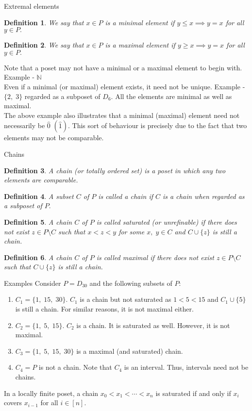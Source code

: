 \documentclass[handout, aspectratio=169]{beamer}
\newtheorem{defn}{Definition}
\begin{document}
\begin{frame}{Extremal elements}
	\begin{defn}
		We say that $x \in P$ is a minimal element if $y \le x \implies y = x$ for all $y \in P.$
	\end{defn}
	\begin{defn}
		We say that $x \in P$ is a maximal element if $y \ge x \implies y = x$ for all $y \in P.$
	\end{defn}
	Note that a poset may not have a minimal or a maximal element to begin with. Example - $\mathbb{N}$\\
	Even if a minimal (or maximal) element exists, it need not be unique. Example - $\{2,\;3\}$ regarded as a subposet of $D_6.$ All the elements are minimal as well as maximal.\\
	The above example also illustrates that a minimal (maximal) element need not necessarily be $\hat{0}$ $(\hat{1}).$ This sort of behaviour is precisely due to the fact that two elements may not be comparable.
\end{frame}

\begin{frame}{Chains}
	\begin{defn}
	A chain (or totally ordered set) is a poset in which any two elements are comparable. 
	\end{defn}
\begin{defn}
	A subset $C$ of $P$ is called a chain if $C$ is a chain when regarded as a subposet of $P.$
\end{defn}
\begin{defn}
	A chain $C$ of $P$ is called saturated (or unrefinable) if there does not exist $z \in P\setminus C$ such that $x < z < y$ for some $x,\;y\in C$ and $C \cup \{z\}$ is still a chain.
\end{defn}
\begin{defn}
	A chain $C$ of $P$ is called maximal if there does not exist $z \in P\setminus C$ such that $C \cup \{z\}$ is still a chain.
\end{defn}
\end{frame}

\begin{frame}{Examples}
	Consider $P = D_{30}$ and the following subsets of $P:$
	\begin{enumerate} 
		\item $C_1 = \{1,\;15,\;30\}.$ $C_1$ is a chain but not saturated as $1 < 5 < 15$ and $C_1 \cup \{5\}$ is still a chain. For similar reasons, it is not maximal either.
		\item $C_2 = \{1,\;5,\;15\}.$ $C_2$ is a chain. It is saturated as well. However, it is not maximal.
		\item $C_3 = \{1,\;5,\;15,\;30\}$ is a maximal (and saturated) chain.
		\item $C_4 = P$ is not a chain. Note that $C_4$ is an interval. Thus, intervals need not be chains.
	\end{enumerate}
	In a locally finite poset, a chain $x_0 < x_1 < \cdots < x_n$ is saturated if and only if $x_i$ covers $x_{i-1}$ for all $i \in [n].$
\end{frame}
\end{document}
